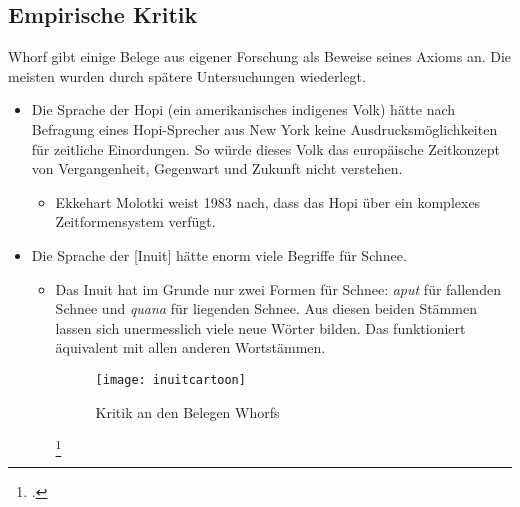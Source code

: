 \documentclass[12pt]{scrreprt}
\begin{document}
		\subsection{Empirische Kritik}
		\label{sec:sawo_empkritik}
		Whorf gibt einige Belege aus eigener Forschung als Beweise seines Axioms an.
		Die meisten wurden durch spätere Untersuchungen wiederlegt.
		\begin{itemize}
			\item Die Sprache der Hopi (ein amerikanisches indigenes Volk) hätte nach
			Befragung eines Hopi-Sprecher aus New York keine
			Ausdrucksmöglichkeiten für zeitliche Einordungen. So würde dieses
			Volk das europäische Zeitkonzept von Vergangenheit, Gegenwart und
			Zukunft nicht verstehen.
				\begin{itemize}
					\item Ekkehart Molotki weist 1983 nach, dass das Hopi über ein komplexes
					Zeitformensystem verfügt.\autocite{wiki:Sapir-Whorf-Hypothese}
				\end{itemize}
				\item Die Sprache der [Inuit] hätte enorm viele Begriffe für Schnee.
				\begin{itemize}
					\item Das Inuit hat im Grunde nur zwei Formen für Schnee: \textit{aput}
					für fallenden Schnee und \textit{quana} für liegenden Schnee. Aus
					diesen beiden Stämmen lassen sich unermesslich viele neue Wörter
					bilden. Das funktioniert äquivalent mit allen anderen Wortstämmen.\autocite{wiki:Sapir-Whorf-Hypothese}
				\begin{figure}[!htb]
					\centering
					\texttt{[image: inuitcartoon]}
					\caption[Kritik an den Belegen Whorfs {\autocite{cartoon:Inuit}}]{Kritik an den Belegen Whorfs\footnotemark}
					\label{fig:sawo_inuitcartoon}
				\end{figure}
				\footcitetext{cartoon:Inuit}
				\end{itemize}
		\end{itemize}
\end{document}
